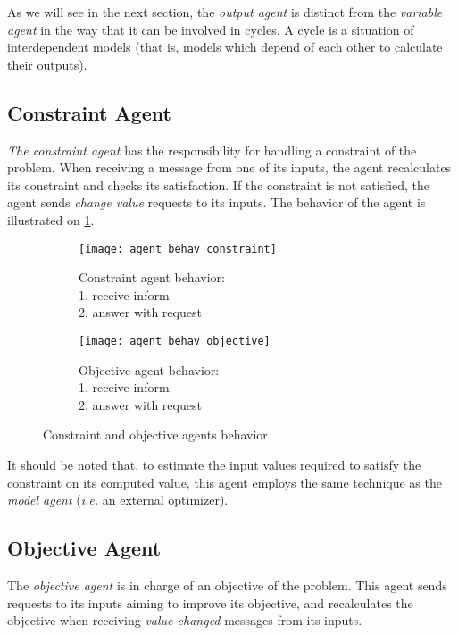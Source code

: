 As we will see in the next section, the \emph{output agent} is distinct from the \emph{variable agent} in the way that it can be involved in cycles. A cycle is a situation of interdependent models (that is, models which depend of each other to calculate their outputs).

\subsection{Constraint Agent}
 \emph{The constraint agent} has the responsibility for handling a constraint of the problem. When receiving a message from one of its inputs, the agent recalculates its constraint and checks its satisfaction. If the constraint is not satisfied, the agent sends \emph{change value} requests to its inputs. The behavior of the agent is illustrated on \figurename{} \ref{agent_behav_constraint}.
 
\begin{figure}
\centering
\begin{subfigure}{0.3\textwidth}
	\texttt{[image: agent\_behav\_constraint]}
	\caption{Constraint agent behavior:\\1. receive inform\\2. answer with 				request}\label{agent_behav_constraint}
\end{subfigure}
\qquad
\begin{subfigure}{0.3\textwidth}
	\texttt{[image: agent\_behav\_objective]}
	\caption{Objective agent behavior:\\1. receive inform\\2. answer with 				request}\label{agent_behav_objective}
\end{subfigure}
\caption{Constraint and objective agents behavior}\label{agent_behav_constraint_and_objective}
\end{figure}

It should be noted that, to estimate the input values required to satisfy the constraint on its computed value, this agent employs the same technique as the \emph{model agent} (\textit{i.e.} an external optimizer).

\subsection{Objective Agent}
The  \emph{objective agent} is in charge of an objective of the problem. This agent sends requests to its inputs aiming to improve its objective, and recalculates the objective when receiving  \emph{value changed} messages from its inputs.

